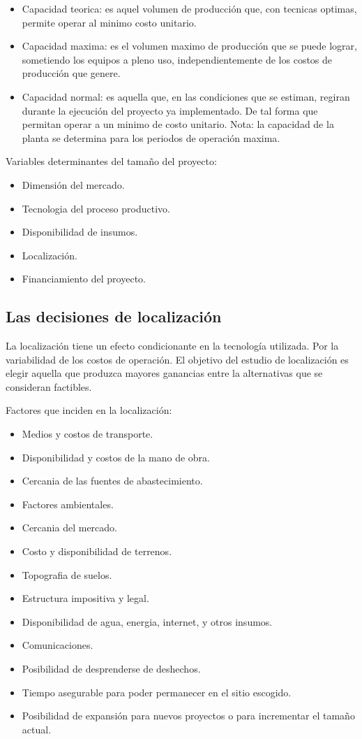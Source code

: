 \documentclass[a4paper, 11pt, oneside]{article}
\begin{document}
\begin{itemize}
	\item Capacidad teorica: es aquel volumen de producción que, con tecnicas optimas, permite operar al minimo costo
	      unitario.
	\item Capacidad maxima: es el volumen maximo de producción que se puede lograr, sometiendo los equipos a pleno
	      uso, independientemente de los costos de producción que genere.
	\item Capacidad normal: es aquella que, en las condiciones que se estiman, regiran durante la ejecución del proyecto
	      ya implementado. De tal forma que permitan operar a un minimo de costo unitario. Nota: la capacidad de la planta
	      se determina para los periodos de operación maxima.
\end{itemize}

Variables determinantes del tamaño del proyecto:

\begin{itemize}
	\item Dimensión del mercado.
	\item Tecnologia del proceso productivo.
	\item Disponibilidad de insumos.
	\item Localización.
	\item Financiamiento del proyecto.
\end{itemize}

\subsection{Las decisiones de localización}
La localización tiene un efecto condicionante en la tecnología utilizada. Por la variabilidad de los costos de operación. El objetivo
del estudio de localización es elegir aquella que produzca mayores ganancias entre la alternativas que se consideran factibles.

Factores que inciden en la localización:

\begin{itemize}
	\item Medios y costos de transporte.
	\item Disponibilidad y costos de la mano de obra.
	\item Cercania de las fuentes de abastecimiento.
	\item Factores ambientales.
	\item Cercania del mercado.
	\item Costo y disponibilidad de terrenos.
	\item Topografia de suelos.
	\item Estructura impositiva y legal.
	\item Disponibilidad de agua, energia, internet, y otros insumos.
	\item Comunicaciones.
	\item Posibilidad de desprenderse de deshechos.
	\item Tiempo asegurable para poder permanecer en el sitio escogido.
	\item Posibilidad de expansión para nuevos proyectos o para incrementar el tamaño actual.
\end{itemize} 
\end{document}
